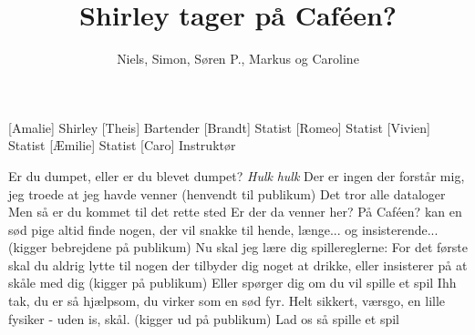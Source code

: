 \documentclass[a4paper,11pt]{article}
\title{Shirley tager på Caféen?}
\author{Niels, Simon, Søren P., Markus og Caroline}
\begin{document}
\maketitle

\begin{roles}
  [Amalie] Shirley
  [Theis] Bartender
  [Brandt] Statist
  [Romeo] Statist
  [Vivien] Statist
  [Æmilie] Statist
  [Caro] Instruktør
\end{roles}

\begin{sketch}
   Er du dumpet, eller er du blevet dumpet?
   \emph{Hulk} \emph{hulk} Der er ingen der forstår mig, jeg troede at jeg havde venner
   (henvendt til publikum) Det tror alle dataloger
   Men så er du kommet til det rette sted
   Er der da venner her?
   På Caféen? kan en sød pige altid finde nogen, der vil snakke til hende, længe... og insisterende... (kigger bebrejdene på publikum)
   Nu skal jeg lære dig spillereglerne: For det første skal du aldrig lytte til nogen der tilbyder dig noget at drikke, eller insisterer på at skåle med dig (kigger på publikum)
   Eller spørger dig om du vil spille et spil
   Ihh tak, du er så hjælpsom, du virker som en sød fyr.
   Helt sikkert, værsgo, en lille fysiker - uden is,  skål.
   (kigger ud på publikum) Lad os så spille et spil

\end{sketch}
\end{document}
